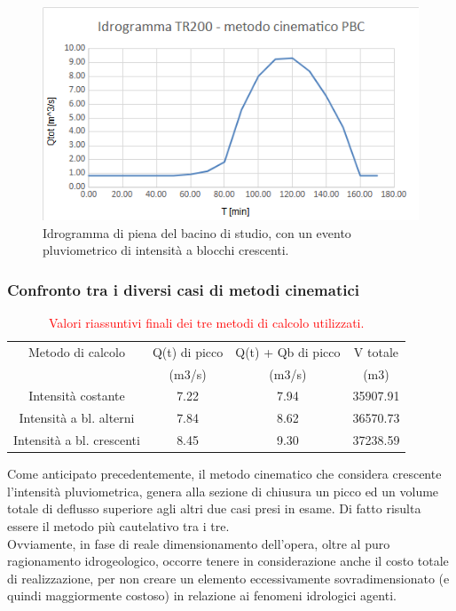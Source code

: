 \begin{figure}[H]  \centering
    \includegraphics[scale=0.8]{immagini/metodo_cinematico_p_b_crescenti.png}
    \caption{Idrogramma di piena del bacino di studio, con un evento pluviometrico di intensità a blocchi crescenti.}
    \label{metodo_cinematico_p_b_crescenti}
\end{figure}    

\subsubsection{Confronto tra i diversi casi di metodi cinematici}

\begin{table}[H] \centering
    \caption{\textcolor{red}{Valori riassuntivi finali dei tre metodi di calcolo utilizzati.}}
        \begin{tabular}{cccc}
        \toprule
        Metodo di calcolo & Q(t) di picco  & Q(t) + Qb  di picco & V totale    \\
         & (m3/s) & (m3/s)     & (m3)     \\
         \midrule
Intensità costante & 7.22 & 7.94 & 35907.91 \\
Intensità a bl. alterni & 7.84 & 8.62 & 36570.73\\
Intensità a bl. crescenti & 8.45 & 9.30 & 37238.59 \\
        \bottomrule
        \end{tabular}
        \end{table}
Come anticipato precedentemente, il metodo cinematico che considera crescente l'intensità pluviometrica, genera alla sezione di chiusura un picco ed un volume totale di deflusso superiore agli altri due casi presi in esame. Di fatto risulta essere il metodo più cautelativo tra i tre.\\
Ovviamente, in fase di reale dimensionamento dell'opera, oltre al puro ragionamento idrogeologico, occorre tenere in considerazione anche il costo totale di realizzazione, per non creare un elemento eccessivamente sovradimensionato (e quindi maggiormente costoso) in relazione ai fenomeni idrologici agenti.